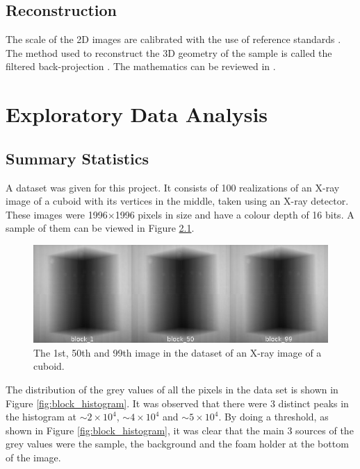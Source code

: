 \documentclass[12pt]{report}
\begin{document}
\section{Reconstruction}
The scale of the 2D images are calibrated with the use of reference standards \cite{bartscher2007enhancement}. The method used to reconstruct the 3D geometry of the sample is called the filtered back-projection \cite{michael2001x}. The mathematics can be reviewed in \cite{brooks1976principles}.

\chapter{Exploratory Data Analysis}
\section{Summary Statistics}
A dataset was given for this project. It consists of 100 realizations of an X-ray image of a cuboid with its vertices in the middle, taken using an X-ray detector. These images were 1996$\times$1996 pixels in size and have a colour depth of 16 bits. A sample of them can be viewed in Figure \ref{fig:block_montage}.

\begin{figure}
\centering
\includegraphics[width=1\textwidth]{figures/block_montage.jpg}
\caption{The 1st, 50th and 99th image in the dataset of an X-ray image of a cuboid.} 
\label{fig:block_montage}
\end{figure}

The distribution of the grey values of all the pixels in the data set is shown in Figure \ref{fig:block_histogram}. It was observed that there were 3 distinct peaks in the histogram at $\sim2\times10^4$, $\sim4\times10^4$ and $\sim5\times10^4$. By doing a threshold, as shown in Figure \ref{fig:block_histogram}, it was clear that the main 3 sources of the grey values were the sample, the background and the foam holder at the bottom of the image.
\end{document}
